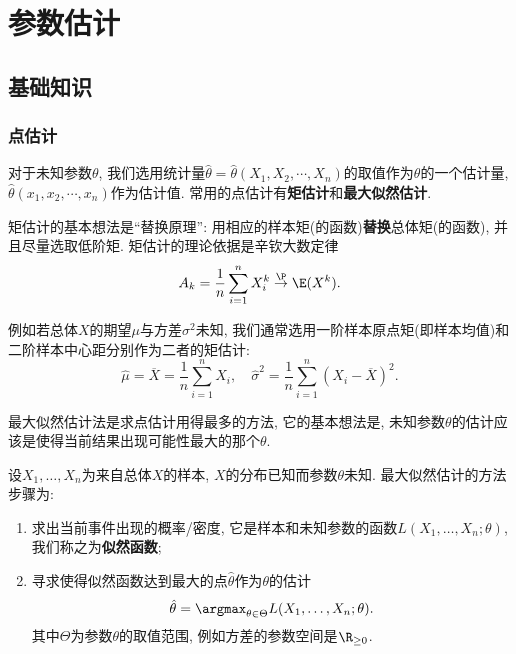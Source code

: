 \documentclass[11pt]{ctexart}
\begin{document}
\section{参数估计}

\subsection{基础知识}

\subsubsection{点估计}

对于未知参数$\theta$, 我们选用统计量$\hat{\theta} = \hat{\theta}(X_1, X_2, \cdots, X_n)$的取值作为$\theta$的一个估计量, $\hat{\theta}(x_1, x_2, \cdots, x_n)$作为估计值. 
常用的点估计有\textbf{矩估计}和\textbf{最大似然估计}. 


矩估计的基本想法是“替换原理”: 用相应的样本矩(的函数)\textbf{替换}总体矩(的函数), 并且尽量选取低阶矩.
矩估计的理论依据是辛钦大数定律
\begin{equation*}
	A_k = \frac{1}{n} \sum_{i=1}^n X_i^k \stackrel{\P}{\to} \E(X^k). 
\end{equation*}

例如若总体$X$的期望$\mu$与方差$\sigma^2$未知, 我们通常选用一阶样本原点矩(即样本均值)和二阶样本中心距分别作为二者的矩估计: 
\begin{equation*}
	\hat{\mu} = \overline X = \frac{1}{n} \sum_{i=1}^n X_i, \quad
	\hat{\sigma}^2 = \frac{1}{n} \sum_{i=1}^n(X_i - \overline X)^2. 
\end{equation*}



最大似然估计法是求点估计用得最多的方法, 它的基本想法是, 未知参数$\theta$的估计应该是使得当前结果出现可能性最大的那个$\theta$. 

设$X_1, \dots, X_n$为来自总体$X$的样本, $X$的分布已知而参数$\theta$未知. 
最大似然估计的方法步骤为: 
\begin{enumerate}
	\item 求出当前事件出现的概率/密度, 它是样本和未知参数的函数$L(X_1, \dots, X_n; \theta)$, 我们称之为\textbf{似然函数}; 
	\item 寻求使得似然函数达到最大的点$\hat \theta$作为$\theta$的估计
		\begin{equation*}
			\hat \theta = \argmax_{\theta \in \Theta} L(X_1, \dots, X_n; \theta). 
		\end{equation*}
		其中$\Theta$为参数$\theta$的取值范围, 例如方差的参数空间是$\R_{\geq 0}$. 
\end{enumerate}
\end{document}
